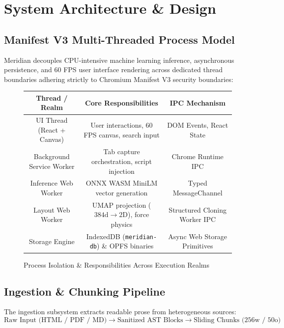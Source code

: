\documentclass{tietreport}
\begin{document}

\chapter{System Architecture \& Design}

\section{Manifest V3 Multi-Threaded Process Model}

Meridian decouples CPU-intensive machine learning inference, asynchronous persistence, and 60 FPS user interface rendering across dedicated thread boundaries adhering strictly to Chromium Manifest V3 security boundaries:

\begin{figure}[htbp]
\centering
\begin{tabular}{|c|c|c|}
\hline
\textbf{Thread / Realm} & \textbf{Core Responsibilities} & \textbf{IPC Mechanism} \\
\hline
UI Thread (React + Canvas) & User interactions, 60 FPS canvas, search input & DOM Events, React State \\
Background Service Worker & Tab capture orchestration, script injection & Chrome Runtime IPC \\
Inference Web Worker & ONNX WASM MiniLM vector generation & Typed MessageChannel \\
Layout Web Worker & UMAP projection ($384\text{d} \to 2\text{D}$), force physics & Structured Cloning Worker IPC \\
Storage Engine & IndexedDB (\texttt{meridian-db}) \& OPFS binaries & Async Web Storage Primitives \\
\hline
\end{tabular}
\caption{Process Isolation \& Responsibilities Across Execution Realms}
\label{tab:process-model}
\end{figure}

\section{Ingestion \& Chunking Pipeline}

The ingestion subsystem extracts readable prose from heterogeneous sources:
\begin{equation}
\text{Raw Input (HTML / PDF / MD)} \longrightarrow \text{Sanitized AST Blocks} \longrightarrow \text{Sliding Chunks (256w / 50o)}
\end{equation}
\end{document}
